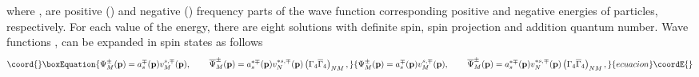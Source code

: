 \documentclass[a4paper,12pt]{article}
\begin{document}
where \coordHE{}, \coordHE{}
are positive (\coordHE{}) and negative (\coordHE{}) frequency parts of the wave function
corresponding positive \coordHE{} and negative \coordHE{} energies of
particles, respectively. For each value of the energy, there are
eight solutions with definite spin, spin projection and addition
quantum number. Wave functions \coordHE{}, \coordHE{} can be expanded in spin
states as follows
\begin{equation}\coord{}\boxEquation{
\Psi _M^{\pm }(\mathbf{p})=a_s^{\mp }(\mathbf{p})v_M^{s,\mp
}(\mathbf{p}) ,\hspace{0.3in}\overline{\Psi }_M^{\pm
}(\mathbf{p})=a_s^{*\mp }(\mathbf{p} )v_N^{*s,\mp
}(\mathbf{p})\left( \Gamma _4\overline{\Gamma }_4\right) _{NM} ,
\label{90}
}{
\Psi _M^{\pm }(\mathbf{p})=a_s^{\mp }(\mathbf{p})v_M^{s,\mp
}(\mathbf{p}) ,\hspace{0.3in}\overline{\Psi }_M^{\pm
}(\mathbf{p})=a_s^{*\mp }(\mathbf{p} )v_N^{*s,\mp
}(\mathbf{p})\left( \Gamma _4\overline{\Gamma }_4\right) _{NM} ,
}{ecuacion}\coordE{}\end{equation}
\end{document}
